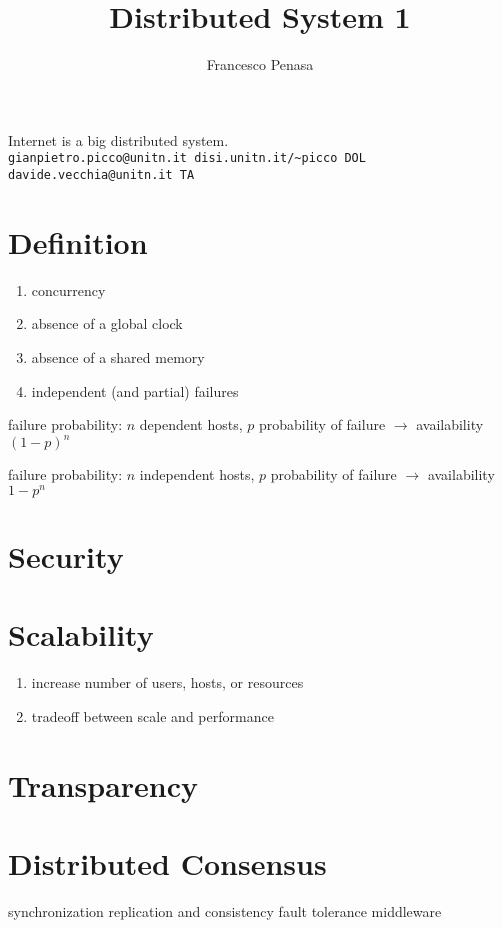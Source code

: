 \documentclass[11pt]{article}
\begin{document}
\author{Francesco Penasa}
\title{Distributed System 1}
\maketitle

\medskip

Internet is a big distributed system. \\
\texttt{gianpietro.picco@unitn.it disi.unitn.it/\~{}picco DOL}\\
\texttt{davide.vecchia@unitn.it TA}


\section{Definition}		
\begin{enumerate}
	\item concurrency
	\item absence of a global clock
	\item absence of a shared memory
	\item independent (and partial) failures
\end{enumerate}

failure probability: $n$ dependent hosts, $p$ probability of failure
$\rightarrow$ availability $(1-p)^n$

failure probability: $n$ independent hosts, $p$ probability of failure
$\rightarrow$ availability $1-p^n$

\section{Security} %
\label{sec:security}


\section{Scalability} %
\label{sec:scalability}
\begin{enumerate}
	\item increase number of users, hosts, or resources
	\item tradeoff between scale and performance
\end{enumerate}


\section{Transparency} %
\label{sec:transparency}



\section{Distributed Consensus} %
\label{sec:distributed_consensus}




synchronization
replication and consistency
fault tolerance
middleware
\end{document}
